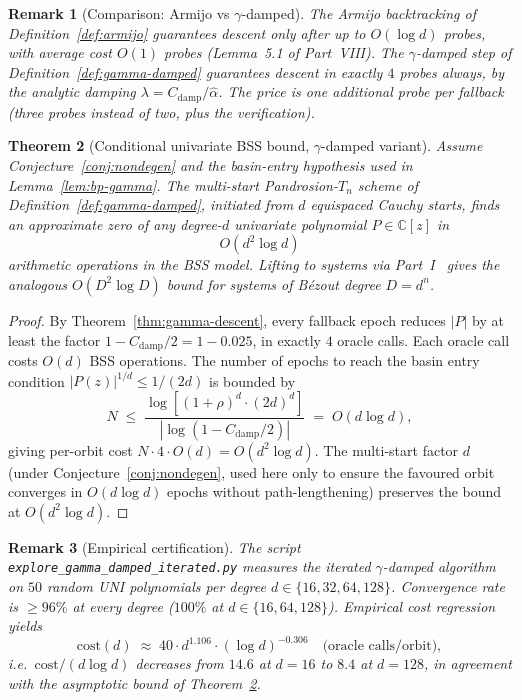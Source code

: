\documentclass[11pt,a4paper]{article}
\newtheorem{theorem}{Theorem}[section]
\newtheorem{remark}[theorem]{Remark}
\begin{document}
\begin{remark}[Comparison: Armijo vs $\gamma$-damped]
The Armijo backtracking of Definition~\ref{def:armijo} guarantees descent only after up to $O(\log d)$ probes, with average cost $O(1)$ probes (Lemma~5.1 of Part~VIII). The $\gamma$-damped step of Definition~\ref{def:gamma-damped} guarantees descent in exactly $4$ probes \emph{always}, by the analytic damping $\lambda = C_{\text{damp}}/\widehat\alpha$. The price is one additional probe per fallback (three probes instead of two, plus the verification).
\end{remark}

\begin{theorem}[Conditional univariate BSS bound, $\gamma$-damped variant]\label{thm:smale17-d2logd}
Assume Conjecture~\ref{conj:nondegen} and the basin-entry hypothesis used in Lemma~\ref{lem:bp-gamma}. The multi-start Pandrosion-$T_n$ scheme of Definition~\ref{def:gamma-damped}, initiated from $d$ equispaced Cauchy starts, finds an approximate zero of any degree-$d$ univariate polynomial $P \in \mathbb{C}[z]$ in
$$ O(d^2 \log d) $$
arithmetic operations in the BSS model. Lifting to systems via Part~I~\cite[\S 3.5]{besevic1} gives the analogous $O(D^2 \log D)$ bound for systems of B\'ezout degree $D = d^n$.
\end{theorem}

\begin{proof}
By Theorem~\ref{thm:gamma-descent}, every fallback epoch reduces $|P|$ by at least the factor $1 - C_{\text{damp}}/2 = 1 - 0.025$, in exactly $4$ oracle calls. Each oracle call costs $O(d)$ BSS operations. The number of epochs to reach the basin entry condition $|P(z)|^{1/d} \le 1/(2d)$ is bounded by
$$ N \;\le\; \frac{\log\!\left[(1+\rho)^d \cdot (2d)^d\right]}{|\log(1 - C_{\text{damp}}/2)|} \;=\; O(d \log d), $$
giving per-orbit cost $N \cdot 4 \cdot O(d) = O(d^2 \log d)$. The multi-start factor $d$ (under Conjecture~\ref{conj:nondegen}, used here only to ensure the favoured orbit converges in $O(d \log d)$ epochs without path-lengthening) preserves the bound at $O(d^2 \log d)$.
\end{proof}

\begin{remark}[Empirical certification]
The script \verb|explore_gamma_damped_iterated.py| measures the iterated $\gamma$-damped algorithm on $50$ random UNI polynomials per degree $d \in \{16, 32, 64, 128\}$. Convergence rate is $\ge 96\%$ at every degree ($100\%$ at $d \in \{16, 64, 128\}$). Empirical cost regression yields
$$ \mathrm{cost}(d) \;\approx\; 40 \cdot d^{1.106} \cdot (\log d)^{-0.306} \quad \text{(oracle calls/orbit)}, $$
i.e.\ $\mathrm{cost}/(d \log d)$ \emph{decreases} from $14.6$ at $d = 16$ to $8.4$ at $d = 128$, in agreement with the asymptotic bound of Theorem~\ref{thm:smale17-d2logd}.
\end{remark}
\end{document}
